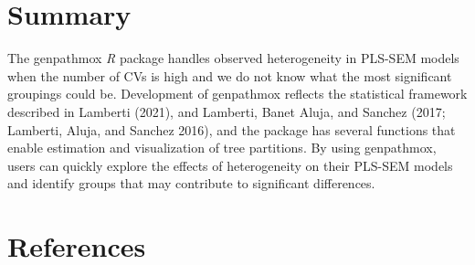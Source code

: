 \hypertarget{summary}{%
\section{Summary}\label{summary}}

The genpathmox \emph{R} package handles observed heterogeneity in PLS-SEM
models when the number of CVs is high and we do not know what the most
significant groupings could be. Development of genpathmox reflects the
statistical framework described in Lamberti (2021), and Lamberti, Banet Aluja, and Sanchez (2017; Lamberti, Aluja, and Sanchez 2016), and the package has several functions that enable
estimation and visualization of tree partitions. By using genpathmox,
users can quickly explore the effects of heterogeneity on their PLS-SEM
models and identify groups that may contribute to significant
differences.

\hypertarget{references}{%
\section*{References}\label{references}}

